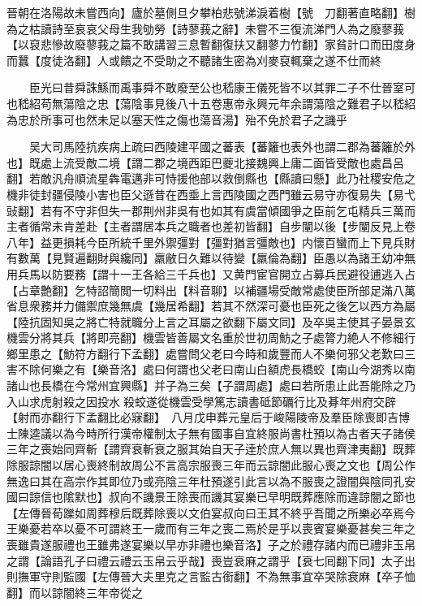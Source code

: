 晉朝在洛陽故未嘗西向】廬於墓側旦夕攀柏悲號涕淚着樹【號　刀翻著直略翻】樹為之枯讀詩至哀哀父母生我劬勞【詩蓼莪之辭】未嘗不三復流涕門人為之廢蓼莪【以裒悲慘故廢蓼莪之篇不敢講習三息暫翻復扶又翻蓼力竹翻】家貧計口而田度身而蠶【度徒洛翻】人或饋之不受助之不聽諸生密為刈麥裒輒棄之遂不仕而終

　　臣光曰昔舜誅鯀而禹事舜不敢廢至公也嵇康王儀死皆不以其罪二子不仕晉室可也嵇紹苟無蕩陰之忠【蕩陰事見後八十五卷惠帝永興元年余謂蕩陰之難君子以嵇紹為忠於所事可也然未足以塞天性之傷也蕩音湯】殆不免於君子之譏乎

　　吴大司馬陸抗疾病上疏曰西陵建平國之蕃表【蕃籬也表外也謂二郡為蕃籬於外也】既處上流受敵二境【謂二郡之境西距巴夔北接魏興上庸二面皆受敵也處昌呂翻】若敵汎舟順流星犇電邁非可恃援他部以救倒縣也【縣讀曰懸】此乃社稷安危之機非徒封疆侵陵小害也臣父遜昔在西埀上言西陵國之西門雖云易守亦復易失【易弋䜴翻】若有不守非但失一郡荆州非吳有也如其有虞當傾國爭之臣前乞屯精兵三萬而主者循常未肯差赴【主者謂居本兵之職者也差初皆翻】自步闡以後【步闡反見上卷八年】益更損耗今臣所統千里外禦彊對【彊對猶言彊敵也】内懷百蠻而上下見兵財有數萬【見賢遍翻財與纔同】羸敝日久難以待變【羸倫為翻】臣愚以為諸王幼冲無用兵馬以防要務【謂十一王各給三千兵也】又黄門宦官開立占募兵民避役逋逃入占【占章艶翻】乞特詔簡閲一切料出【料音聊】以補疆場受敵常處使臣所部足滿八萬省息衆務并力備禦庶幾無虞【幾居希翻】若其不然深可憂也臣死之後乞以西方為屬【陸抗固知吳之將亡特就職分上言之耳屬之欲翻下屬文同】及卒吳主使其子晏景玄機雲分將其兵【將即亮翻】機雲皆善屬文名重於世初周魴之子處膂力絶人不修細行鄉里患之【魴符方翻行下孟翻】處嘗問父老曰今時和歲豐而人不樂何邪父老歎曰三害不除何樂之有【樂音洛】處曰何謂也父老曰南山白額虎長橋蛟【南山今湖秀以南諸山也長橋在今常州宜興縣】并子為三矣【子謂周處】處曰若所患止此吾能除之乃入山求虎射殺之因投水殺蛟遂從機雲受學篤志讀書砥節礪行比及朞年州府交辟【射而亦翻行下孟翻比必寐翻】　八月戊申葬元皇后于峻陽陵帝及羣臣除喪即吉博士陳逵議以為今時所行漢帝權制太子無有國事自宜終服尚書杜預以為古者天子諸侯三年之喪始同齊斬【謂齊衰斬衰之服其始自天子逹於庶人無以異也齊津夷翻】既葬除服諒闇以居心喪終制故周公不言高宗服喪三年而云諒闇此服心喪之文也【周公作無逸曰其在高宗作其即位乃或亮陰三年杜預遂引此言以為不服喪之證闇與陰同孔安國曰諒信也隂默也】叔向不譏景王除喪而譏其宴樂已早明既葬應除而違諒闇之節也【左傳晉荀躒如周葬穆后既葬除喪以文伯宴叔向曰王其不終乎吾聞之所樂必卒焉今王樂憂若卒以憂不可謂終王一歲而有三年之喪二焉於是乎以喪賓宴樂憂甚矣三年之喪雖貴遂服禮也王雖弗遂宴樂以早亦非禮也樂音洛】子之於禮存諸内而已禮非玉帛之謂【論語孔子曰禮云禮云玉帛云乎哉】喪豈衰麻之謂乎【衰七囘翻下同】太子出則撫軍守則監國【左傳晉大夫里克之言監古銜翻】不為無事宜卒哭除衰麻【卒子恤翻】而以諒闇終三年帝從之

